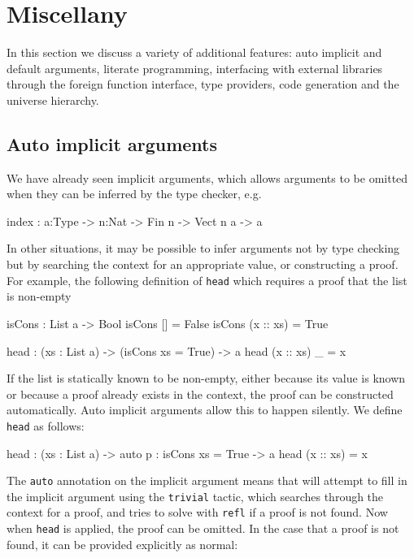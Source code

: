 \section{Miscellany}

In this section we discuss a variety of additional features:
auto implicit and default 
arguments, literate programming, interfacing with external libraries through the
foreign function interface, type providers, code generation and the universe hierarchy.

\subsection{Auto implicit arguments}

We have already seen implicit arguments, which allows arguments to be omitted when
they can be inferred by the type checker, e.g.

\begin{code}
index : {a:Type} -> {n:Nat} -> Fin n -> Vect n a -> a
\end{code}

\noindent
In other situations, it may be possible to infer arguments not by type checking but
by searching the context for an appropriate value, or constructing a proof. For example,
the following definition of \texttt{head} which requires a proof that the list is
non-empty

\begin{code}
isCons : List a -> Bool
isCons [] = False
isCons (x :: xs) = True

head : (xs : List a) -> (isCons xs = True) -> a
head (x :: xs) _ = x
\end{code} 

\noindent
If the list is statically known to be non-empty, either because its value is known or
because a proof already exists in the context, the proof can be constructed
automatically. Auto implicit arguments allow this to happen silently. We define
\texttt{head} as follows:

\begin{code}
head : (xs : List a) -> {auto p : isCons xs = True} -> a
head (x :: xs) = x
\end{code} 

\noindent
The \texttt{auto} annotation on the implicit argument means that \Idris{} will
attempt to fill in the implicit argument using the \texttt{trivial} tactic, which
searches through the context for a proof, and tries to solve with \texttt{refl}
if a proof is not found.
Now when \texttt{head} is applied, the proof can be omitted. In the case that a proof
is not found, it can be provided explicitly as normal:

